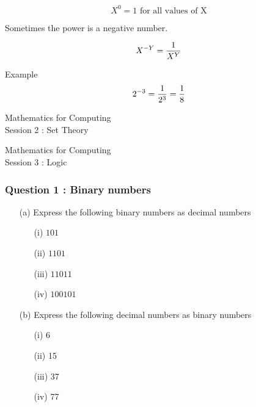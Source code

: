 \documentclass[]{report}
\begin{document}
\[  X^ 0 = 1 \mbox{ for all values of X} \]

Sometimes the power is a negative number.

\[  X^{-Y} = { 1 \over X^Y}  \]

Example 
\[  2^{-3} = { 1 \over 2^3} = { 1 \over 8}  \]


\newpage
\begin{center}
\huge{Mathematics for Computing}\\
{ Session 2 : Set Theory}
\end{center}



\newpage
\begin{center}
\huge{Mathematics for Computing}\\
{ Session 3 : Logic}
\end{center}




\subsubsection*{Question 1 : Binary numbers}
\begin{itemize}
\item[(a)] Express the following binary numbers as decimal numbers
\begin{multicols}{2}
\begin{itemize}
\item[(i)] $101$
\item[(ii)] $1101$
\item[(iii)] $11011$
\item[(iv)] $100101$
\end{itemize}
\end{multicols}

\item[(b)] Express the following decimal numbers as binary numbers
\begin{multicols}{2}
\begin{itemize}
\item[(i)] 6
\item[(ii)] 15
\item[(iii)] 37
\item[(iv)] 77
\end{itemize}
\end{multicols}

\end{itemize}
\end{document}
